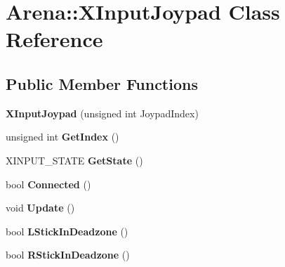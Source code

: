 \hypertarget{class_arena_1_1_x_input_joypad}{\section{Arena\+:\+:X\+Input\+Joypad Class Reference}
\label{class_arena_1_1_x_input_joypad}
}
\subsection*{Public Member Functions}
\begin{DoxyCompactItemize}
\item 
\hypertarget{class_arena_1_1_x_input_joypad_aea463be3d8aaff9de3a6b3640275a383}{{\bfseries X\+Input\+Joypad} (unsigned int Joypad\+Index)}\label{class_arena_1_1_x_input_joypad_aea463be3d8aaff9de3a6b3640275a383}

\item 
\hypertarget{class_arena_1_1_x_input_joypad_a1d4160a4bd1b5d58fffb273fdd212f9c}{unsigned int {\bfseries Get\+Index} ()}\label{class_arena_1_1_x_input_joypad_a1d4160a4bd1b5d58fffb273fdd212f9c}

\item 
\hypertarget{class_arena_1_1_x_input_joypad_a1deaa8436fd099405de8192c51d74406}{X\+I\+N\+P\+U\+T\+\_\+\+S\+T\+A\+T\+E {\bfseries Get\+State} ()}\label{class_arena_1_1_x_input_joypad_a1deaa8436fd099405de8192c51d74406}

\item 
\hypertarget{class_arena_1_1_x_input_joypad_abb66d5d731828109368c4433a835a973}{bool {\bfseries Connected} ()}\label{class_arena_1_1_x_input_joypad_abb66d5d731828109368c4433a835a973}

\item 
\hypertarget{class_arena_1_1_x_input_joypad_a4b949ad155d2e9285a3357b4c694fd55}{void {\bfseries Update} ()}\label{class_arena_1_1_x_input_joypad_a4b949ad155d2e9285a3357b4c694fd55}

\item 
\hypertarget{class_arena_1_1_x_input_joypad_a8882d1c8bae7ce7d4ab8bd54eda47652}{bool {\bfseries L\+Stick\+In\+Deadzone} ()}\label{class_arena_1_1_x_input_joypad_a8882d1c8bae7ce7d4ab8bd54eda47652}

\item 
\hypertarget{class_arena_1_1_x_input_joypad_ac1e032e652239a7c5c942ce55d217952}{bool {\bfseries R\+Stick\+In\+Deadzone} ()}\label{class_arena_1_1_x_input_joypad_ac1e032e652239a7c5c942ce55d217952}


\end{DoxyCompactItemize}
